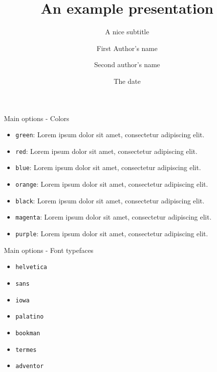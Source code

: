 \documentclass[10pt,numbering,toc]{bpslides}
\title[Short title]{An example presentation}
\subtitle{A nice subtitle}
\author[Short Authors Name]{First Author's name\inst{1} \and Second author's name\inst{2}}
\institute{\inst{1} First institute\vs\\\inst{2} Second institute}
\date[Short date]{The date}
\begin{document}
\begin{frame}[plain]
	\titlepage
\end{frame}

\begin{frame}{Main options - Colors}\label{firstslide}
\begin{itemize}
\item \texttt{green}: {\color{green0}Lorem ipsum dolor sit amet, consectetur adipiscing elit}.\hfill {}
\item \texttt{red}: {\color{red0}Lorem ipsum dolor sit amet, consectetur adipiscing elit}.
\item \texttt{blue}: {\color{blue0}Lorem ipsum dolor sit amet, consectetur adipiscing elit}.
\item \texttt{orange}: {\color{orange0}Lorem ipsum dolor sit amet, consectetur adipiscing elit}.
\item \texttt{black}: {\color{black}Lorem ipsum dolor sit amet, consectetur adipiscing elit}.
\item \texttt{magenta}: {\color{magenta0}Lorem ipsum dolor sit amet, consectetur adipiscing elit}.
\item \texttt{purple}: {\color{purple0}Lorem ipsum dolor sit amet, consectetur adipiscing elit}.
\end{itemize}
\end{frame}

\begin{frame}{Main options - Font typefaces}\label{firstslide}
\begin{itemize}
\item \texttt{helvetica}
\item \texttt{sans}
\item \texttt{iowa}
\item \texttt{palatino}
\item \texttt{bookman}
\item \texttt{termes}
\item \texttt{adventor}
\end{itemize}
\end{frame}
\end{document}
